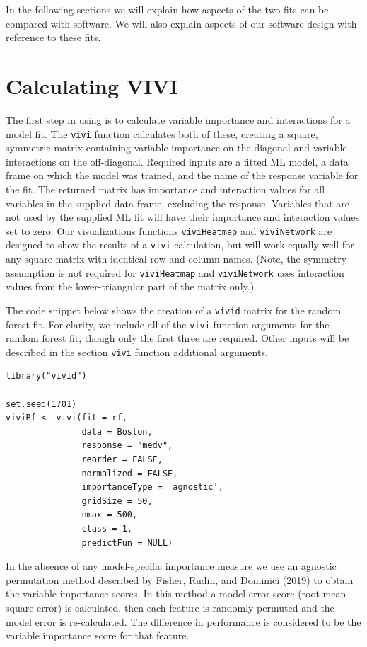 In the following sections we will explain how aspects of the two fits can be compared with  software. We will also explain aspects of our software design with reference to these fits.

\hypertarget{data}{%
\section{Calculating VIVI}\label{data}}

The first step in using  is to calculate variable importance and interactions for a model fit.
The \texttt{vivi} function calculates both of these, creating a square, symmetric matrix containing variable importance on the diagonal and variable interactions on the off-diagonal. Required inputs are a fitted ML model, a data frame on which the model was trained, and the name of the response variable for the fit. The returned matrix has importance and interaction values for all variables in the supplied data frame, excluding the response. Variables that are not used by the supplied ML fit will have their importance and interaction values set to zero. Our visualizations functions \texttt{viviHeatmap} and \texttt{viviNetwork} are designed to show the results of a \texttt{vivi} calculation, but will work equally well for any square matrix with identical row and column names. (Note, the symmetry assumption is not required for \texttt{viviHeatmap} and \texttt{viviNetwork} uses interaction values from the lower-triangular part of the matrix only.)

The code snippet below shows the creation of a \texttt{vivid} matrix for the random forest fit. For clarity, we include all of the \texttt{vivi} function arguments for the random forest fit, though only the first three are required. Other inputs will be described in the section \protect\hyperlink{sec:vivimatarg}{\texttt{vivi} function additional arguments}.

\begin{verbatim}
library("vivid")

set.seed(1701)
viviRf <- vivi(fit = rf,
               data = Boston,
               response = "medv",
               reorder = FALSE,
               normalized = FALSE,
               importanceType = 'agnostic',
               gridSize = 50,
               nmax = 500,
               class = 1,
               predictFun = NULL)
\end{verbatim}

In the absence of any model-specific importance measure we use an agnostic permutation method described by Fisher, Rudin, and Dominici (2019) to obtain the variable importance scores. In this method a model error score (root mean square error) is calculated, then each feature is randomly permuted and the model error is re-calculated. The difference in performance is considered to be the variable importance score for that feature.

